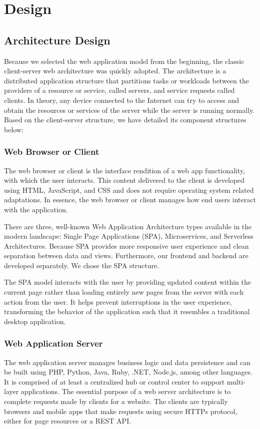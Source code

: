\section{Design}
\label{sec:Design}

\subsection{Architecture Design}
\label{sec:Design>Architecture Design}
Because we selected the web application model from the beginning, the classic client-server web architecture was quickly adopted. The architecture is a distributed application structure that partitions tasks or workloads between the providers of a resource or service, called servers, and service requests called clients. In theory, any device connected to the Internet can try to access and obtain the resources or services of the server while the server is running normally. Based on the client-server structure, we have detailed its component structures below:

\subsubsection{Web Browser or Client}
\label{sec:Design>Architecture Design>Web Browser or Client}
The web browser or client is the interface rendition of a web app functionality, with which the user interacts. This content delivered to the client is developed using HTML, JavaScript, and CSS and does not require operating system related adaptations. In essence, the web browser or client manages how end users interact with the application.

There are three, well-known Web Application Architecture types available in the modern landscape: Single Page Applications (SPA), Microservices, and Serverless Architectures. Because SPA provides more responsive user experience and clean separation between data and views. Furthermore, our frontend and backend are developed separately. We chose the SPA structure.

The SPA model interacts with the user by providing updated content within the current page rather than loading entirely new pages from the server with each action from the user. It helps prevent interruptions in the user experience, transforming the behavior of the application such that it resembles a traditional desktop application.

\subsubsection{Web Application Server}
\label{sec:Design>Architecture Design>Web Application Server}
The web application server manages business logic and data persistence and can be built using PHP, Python, Java, Ruby, .NET, Node.js, among other languages. It is comprised of at least a centralized hub or control center to support multi-layer applications. The essential purpose of a web server architecture is to complete requests made by clients for a website. The clients are typically browsers and mobile apps that make requests using secure HTTPs protocol, either for page resources or a REST API.

